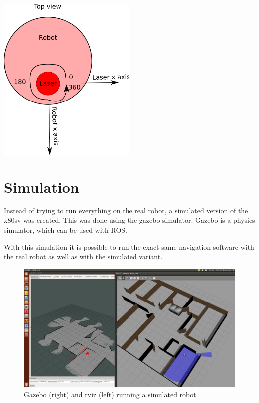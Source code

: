 \documentclass[a4paper]{article}
\begin{document}
\includegraphics[width=0.5\textwidth,height=\textheight,keepaspectratio]{img/laser_orientation.png}

\section{Simulation}
Instead of trying to run everything on the real robot, a simulated version of the x80sv
was created. This was done using the gazebo simulator. Gazebo is a physics simulator, which can be
used with ROS.

With this simulation it is possible to run the exact same navigation software with the real
robot as well as with the simulated variant.

\begin{figure}[h!]
  \centering
  \includegraphics[width=\textwidth,height=\textheight,keepaspectratio]{img/office_sim_testgmapping.png}
  \caption{Gazebo (right) and rviz (left) running a simulated robot}
\end{figure}
\end{document}
